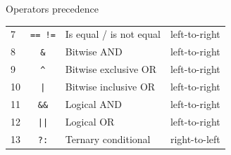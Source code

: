 \begin{frame}{Operators precedence}
{\begin{tabular}{l|c|l|l}
            7  & \texttt{== !=} & Is equal / is not equal & left-to-right \\
            8  & \texttt{\&}    & Bitwise AND             & left-to-right \\
            9  & \texttt{\^}    & Bitwise exclusive OR    & left-to-right \\
            10 & \texttt{|}     & Bitwise inclusive OR    & left-to-right \\
            11 & \texttt{\&\&}  & Logical AND             & left-to-right \\
            12 & \texttt{||}    & Logical OR              & left-to-right \\
            13 & \texttt{?:}    & Ternary conditional     & right-to-left \\
        \end{tabular}
    }


\end{frame}
